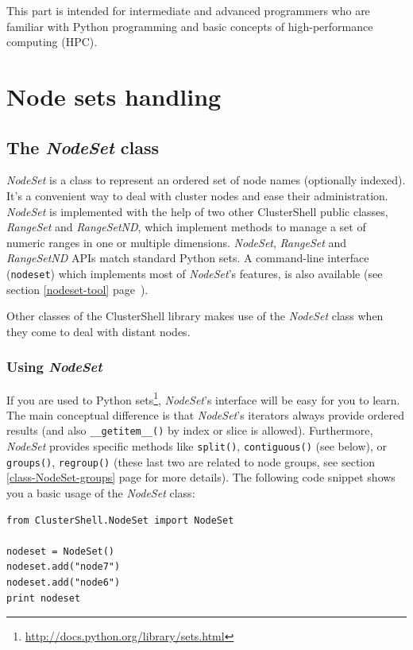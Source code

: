\documentclass[english,a4paper]{csuserguide}
\newcommand{\NodeSet}{\textit{NodeSet}\xspace}
\newcommand{\RangeSet}{\textit{RangeSet}\xspace}
\newcommand{\RangeSetND}{\textit{RangeSetND}\xspace}
\newcommand{\nodeset}{\texttt{nodeset}\xspace}
\begin{document}
This part is intended for intermediate and advanced programmers who are familiar with Python programming and basic concepts of high-performance computing (HPC).


\section{Node sets handling}

\subsection{The \NodeSet class}
\label{class-NodeSet}

\NodeSet is a class to represent an ordered set of node names (optionally indexed). It's a convenient way to deal with cluster nodes and ease their administration. \NodeSet is implemented with the help of two other ClusterShell public classes, \RangeSet and \RangeSetND, which implement methods to manage a set of numeric ranges in one or multiple dimensions. \NodeSet, \RangeSet and \RangeSetND APIs match standard Python sets.   A command-line interface (\nodeset) which implements most of \NodeSet's features, is also available (see section \ref{nodeset-tool} page~\pageref{nodeset-tool}).

Other classes of the ClusterShell library makes use of the \NodeSet class when they come to deal with distant nodes.

\subsubsection{Using \NodeSet}

If you are used to Python sets\footnote{\url{http://docs.python.org/library/sets.html}}, \NodeSet's interface will be easy for you to learn. The main conceptual difference is that \NodeSet's iterators always provide ordered results (and also  \lstinline+__getitem__()+ by index or slice is allowed). Furthermore, \NodeSet provides specific methods like  \lstinline+split()+,  \lstinline+contiguous()+ (see below), or  \lstinline+groups()+,  \lstinline+regroup()+ (these last two are related to node groups, see section  \ref{class-NodeSet-groups} page \pageref{class-NodeSet-groups} for more details). The following code snippet shows you a basic usage of the \NodeSet class:
\bigskip

\begin{lstlisting}[breaklines=true, breakatwhitespace=true]
from ClusterShell.NodeSet import NodeSet

nodeset = NodeSet()
nodeset.add("node7")
nodeset.add("node6")
print nodeset
\end{lstlisting}
\end{document}
